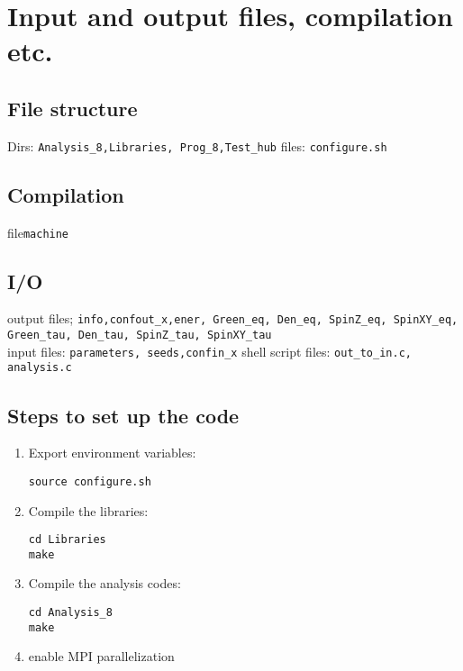 \section{Input and output files, compilation etc.}\label{sec:io}

\subsection{File structure}
Dirs: \texttt{Analysis\_8,Libraries, Prog\_8,Test\_hub}
files: \texttt{configure.sh}

\subsection{Compilation}
file\texttt{machine} 
\subsection{I/O}
output files; \texttt{info,confout\_x,ener, Green\_eq, Den\_eq, SpinZ\_eq, SpinXY\_eq, Green\_tau, Den\_tau, SpinZ\_tau, SpinXY\_tau}\\
input files: \texttt{parameters, seeds,confin\_x}
shell script files: \texttt{out\_to\_in.c, analysis.c}



\subsection{Steps to set up the code}
\begin{enumerate}
\item Export  environment variables:
\begin{verbatim}
source configure.sh
\end{verbatim}
\item Compile the libraries: 
\begin{verbatim}
cd Libraries
make
\end{verbatim}
\item Compile the analysis codes: 
\begin{verbatim}
cd Analysis_8
make
\end{verbatim}
\item enable MPI parallelization

\end{enumerate}
